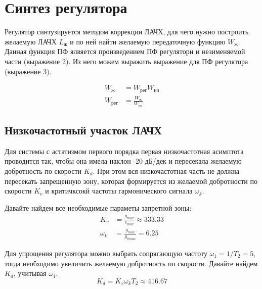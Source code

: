 \documentclass[russian, utf8]{eskdtext}
\begin{document}
\newpage
\section{Синтез регулятора}
Регулятор синтузируется методом коррекции ЛАЧХ, для чего нужно построить желаемую ЛАЧХ $L_\text{ж}$ и по ней найти желаемую передаточную функцию $W_\text{ж}$. Данная функция ПФ ялвяется произведением ПФ регулятори и незименяемой части (выражение 2). Из него можем выражить выражение для ПФ регулятора (выражение 3).\par
\begin{align}
    W_\text{ж} & = W_\text{рег}W_\text{нч} \\
    W_\text{рег} & = \frac{W_\text{ж}}{W_\text{нч}}
\end{align} \par
\subsection{Низкочастотный участок ЛАЧХ}
Для системы с астатизмом первого порядка первая низкочастотная асимптота проводится так, чтобы она имела наклон -20 дБ/дек и пересекала желаемую добротность по скорости $K_d$. При этом вся низкочастотная часть не должна пересекать запрещенную зону, которая формируется из желаемой добротности по скорости $K_v$ и критичксокй частоты гармонического сигнала $\omega_k$.\par
Давайте найдем все необходимые параметы запретной зоны:
\begin{align} 
    K_v &= \frac{g_{max}}{e_{max}} \approx 333.33 \\
    \omega_k & = \frac{g_{max}}{g_{0max}} = 6.25
\end{align} \par

Для упрощения регулятора можно выбрать сопрягающую частоту $\omega_1 = 1/T_2 = 5$, тогда необходимо увеличить желаемую добротность по скорости. Давайте найдем $K_d$, учитывая $\omega_1$.
\begin{equation}
    K_d = K_v\omega_kT_2 \approx 416.67
\end{equation}
\end{document}
